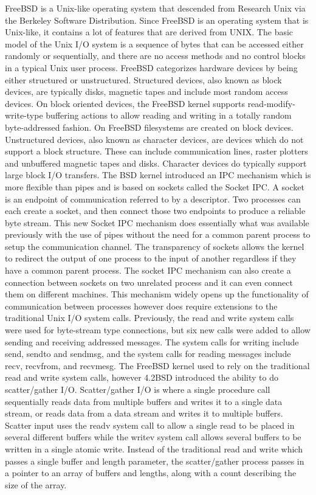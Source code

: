 \documentclass[letterpaper,10pt,draftclsnofoot,onecolumn,titlepage]{IEEEtran}
\begin{document}
	FreeBSD is a Unix-like operating system that descended from Research Unix via the Berkeley Software Distribution.
	Since FreeBSD is an operating system that is Unix-like, it contains a lot of features that are derived from UNIX.
	The basic model of the Unix I/O system is a sequence of bytes that can be accessed either randomly or sequentially, and there are no access methods and no control blocks in a typical Unix user process.
	FreeBSD categorizes hardware devices by being either structured or unstructured.
	Structured devices, also known as block devices, are typically disks, magnetic tapes and include most random access devices.
	On block oriented devices, the FreeBSD kernel supports read-modify-write-type buffering actions to allow reading and writing in a totally random byte-addressed fashion.
	On FreeBSD filesystems are created on block devices.
	Unstructured devices, also known as character devices, are devices which do not support a block structure.
	These can include communication lines, raster plotters and unbuffered magnetic tapes and disks.
	Character devices do typically support large block I/O transfers.
	The BSD kernel introduced an IPC mechanism which is more flexible than pipes and is based on sockets called the Socket IPC.
	A socket is an endpoint of communication referred to by a descriptor.
	Two processes can each create a socket, and then connect those two endpoints to produce a reliable byte stream.
	This new Socket IPC mechanism does essentially what was available previously with the use of pipes without the need for a common parent process to setup the communication channel.
	The transparency of sockets allows the kernel to redirect the output of one process to the input of another regardless if they have a common parent process.
	The socket IPC mechanism can also create a connection between sockets on two unrelated process and it can even connect them on different machines.
	This mechanism widely opens up the functionality of communication between processes however does require extensions to the traditional Unix I/O system calls.
	Previously, the read and write system calls were used for byte-stream type connections, but six new calls were added to allow sending and receiving addressed messages.
	The system calls for writing include send, sendto and sendmsg, and the system calls for reading messages include recv, recvfrom, and recvmesg.
	The FreeBSD kernel used to rely on the traditional read and write system calls, however 4.2BSD introduced the ability to do scatter/gather I/O. \cite{FreeBSD}
	Scatter/gather I/O is where a single procedure call sequentially reads data from multiple buffers and writes it to a single data stream, or reads data from a data stream and writes it to multiple buffers.
	Scatter input uses the readv system call to allow a single read to be placed in several different buffers while the writev system call allows several buffers to be written in a single atomic write.
	Instead of the traditional read and write which passes a single buffer and length parameter, the scatter/gather process passes in a pointer to an array of buffers and lengths, along with a count describing the size of the array.
\end{document}
